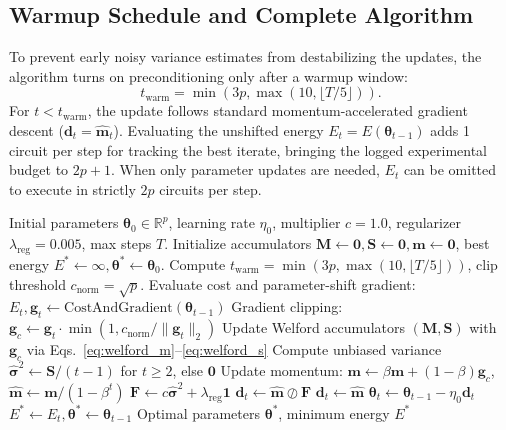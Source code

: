 \documentclass[11pt,a4paper]{article}
\begin{document}
\subsection{Warmup Schedule and Complete Algorithm}
To prevent early noisy variance estimates from destabilizing the updates, the algorithm turns on preconditioning only after a warmup window:
\begin{equation}
t_{\text{warm}} = \min(3p, \max(10, \lfloor T / 5 \rfloor)).
\label{eq:warmup}
\end{equation}
For $t < t_{\text{warm}}$, the update follows standard momentum-accelerated gradient descent ($\mathbf{d}_t = \hat{\mathbf{m}}_t$). Evaluating the unshifted energy $E_t = E(\boldsymbol{\theta}_{t-1})$ adds 1 circuit per step for tracking the best iterate, bringing the logged experimental budget to $2p+1$. When only parameter updates are needed, $E_t$ can be omitted to execute in strictly $2p$ circuits per step.

\begin{algorithm}[H]
\caption{SIGMA-QGD Optimization Algorithm}
\label{alg:sigma_qgd}
\begin{algorithmic}[1]
\REQUIRE Initial parameters $\boldsymbol{\theta}_0 \in \mathbb{R}^p$, learning rate $\eta_0$, multiplier $c=1.0$, regularizer $\lambda_{\text{reg}}=0.005$, max steps $T$.
\STATE Initialize accumulators $\mathbf{M} \leftarrow \mathbf{0}, \mathbf{S} \leftarrow \mathbf{0}, \mathbf{m} \leftarrow \mathbf{0}$, best energy $E^* \leftarrow \infty, \boldsymbol{\theta}^* \leftarrow \boldsymbol{\theta}_0$.
\STATE Compute $t_{\text{warm}} = \min(3p, \max(10, \lfloor T/5 \rfloor))$, clip threshold $c_{\text{norm}} = \sqrt{p}$.
    \STATE Evaluate cost and parameter-shift gradient: $E_t, \mathbf{g}_t \leftarrow \text{CostAndGradient}(\boldsymbol{\theta}_{t-1})$ \hfill {}
    \STATE Gradient clipping: $\mathbf{g}_c \leftarrow \mathbf{g}_t \cdot \min(1, c_{\text{norm}} / \|\mathbf{g}_t\|_2)$
    \STATE Update Welford accumulators $(\mathbf{M}, \mathbf{S})$ with $\mathbf{g}_c$ via Eqs.~\eqref{eq:welford_m}--\eqref{eq:welford_s}
    \STATE Compute unbiased variance $\hat{\boldsymbol{\sigma}}^2 \leftarrow \mathbf{S} / (t-1)$ for $t \ge 2$, else $\mathbf{0}$
    \STATE Update momentum: $\mathbf{m} \leftarrow \beta \mathbf{m} + (1-\beta)\mathbf{g}_c$, $\hat{\mathbf{m}} \leftarrow \mathbf{m} / (1-\beta^t)$
        \STATE $\mathbf{F} \leftarrow c \hat{\boldsymbol{\sigma}}^2 + \lambda_{\text{reg}} \mathbf{1}$
        \STATE $\mathbf{d}_t \leftarrow \hat{\mathbf{m}} \oslash \mathbf{F}$
    \ELSE
        \STATE $\mathbf{d}_t \leftarrow \hat{\mathbf{m}}$
    \ENDIF
    \STATE $\boldsymbol{\theta}_t \leftarrow \boldsymbol{\theta}_{t-1} - \eta_0 \mathbf{d}_t$
        \STATE $E^* \leftarrow E_t, \boldsymbol{\theta}^* \leftarrow \boldsymbol{\theta}_{t-1}$
    \ENDIF
\ENDFOR
\RETURN Optimal parameters $\boldsymbol{\theta}^*$, minimum energy $E^*$
\end{algorithmic}
\end{algorithm}
\end{document}
